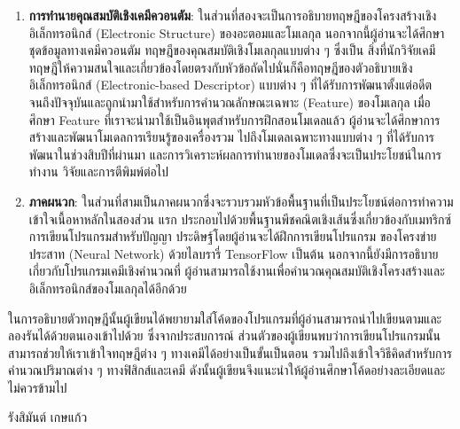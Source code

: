 {\begin{enumerate}[topsep=0pt]
    \item \textbf{การทำนายคุณสมบัติเชิงเคมีควอนตัม}: ในส่วนที่สองจะเป็นการอธิบายทฤษฎีของโครงสร้างเชิงอิเล็กทรอนิกส์ (Electronic 
    Structure) ของอะตอมและโมเลกุล นอกจากนี้ผู้อ่านจะได้ศึกษาชุดข้อมูลทางเคมีควอนตัม ทฤษฎีของคุณสมบัติเชิงโมเลกุลแบบต่าง ๆ ซึ่งเป็น%
    สิ่งที่นักวิจัยเคมีทฤษฎีให้ความสนใจและเกี่ยวข้องโดยตรงกับหัวข้อถัดไปนั่นก็คือทฤษฎีของตัวอธิบายเชิงอิเล็กทรอนิกส์ (Electronic-based 
    Descriptor) แบบต่าง ๆ ที่ได้รับการพัฒนาตั้งแต่อดีตจนถึงปัจจุบันและถูกนำมาใช้สำหรับการคำนวณลักษณะเฉพาะ (Feature) ของโมเลกุล 
    เมื่อศึกษา Feature ที่เราจะนำมาใช้เป็นอินพุตสำหรับการฝึกสอนโมเดลแล้ว ผู้อ่านจะได้ศึกษาการสร้างและพัฒนาโมเดลการเรียนรู้ของเครื่องรวม%
    ไปถึงโมเดลเฉพาะทางแบบต่าง ๆ ที่ได้รับการพัฒนาในช่วงสิบปีที่ผ่านมา และการวิเคราะห์ผลการทำนายของโมเดลซึ่งจะเป็นประโยชน์ในการทำงาน%
    วิจัยและการตีพิมพ์ต่อไป

    \item \textbf{ภาคผนวก}: ในส่วนที่สามเป็นภาคผนวกซึ่งจะรวบรวมหัวข้อพื้นฐานที่เป็นประโยชน์ต่อการทำความเข้าใจเนื้อหาหลักในสองส่วน%
    แรก ประกอบไปด้วยพื้นฐานพีชคณิตเชิงเส้นซึ่งเกี่ยวข้องกับเมทริกซ์ การเขียนโปรแกรมสำหรับปัญญา ประดิษฐ์โดยผู้อ่านจะได้ฝึกการเขียนโปรแกรม%
    ของโครงข่ายประสาท (Neural Network) ด้วยไลบรารี่ TensorFlow เป็นต้น นอกจากนี้ยังมีการอธิบายเกี่ยวกับโปรแกรมเคมีเชิงคำนวณที่%
    ผู้อ่านสามารถใช้งานเพื่อคำนวณคุณสมบัติเชิงโครงสร้างและอิเล็กทรอนิกส์ของโมเลกุลได้อีกด้วย
\end{enumerate}

ในการอธิบายตัวทฤษฎีนั้นผู้เขียนได้พยายามใส่โค้ดของโปรแกรมที่ผู้อ่านสามารถนำไปเขียนตามและลองรันได้ด้วยตนเองเข้าไปด้วย ซึ่งจากประสบการณ์%
ส่วนตัวของผู้เขียนพบว่าการเขียนโปรแกรมนั้นสามารถช่วยให้เราเข้าใจทฤษฎีต่าง ๆ ทางเคมีได้อย่างเป็นขั้นเป็นตอน รวมไปถึงเข้าใจวิธีคิดสำหรับการ%
คำนวณปริมาณต่าง ๆ ทางฟิสิกส์และเคมี ดังนั้นผู้เขียนจึงแนะนำให้ผู้อ่านศึกษาโค้ดอย่างละเอียดและไม่ควรข้ามไป

\medskip

\begin{flushright}
รังสิมันต์ เกษแก้ว
\end{flushright}
}
